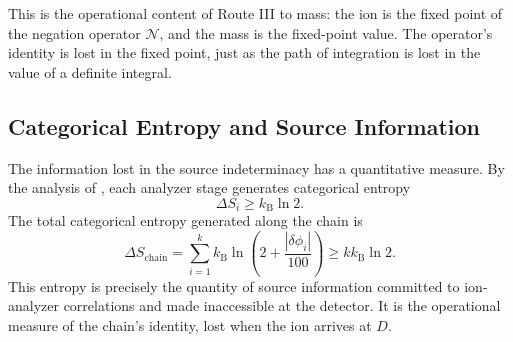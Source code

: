 \documentclass[twocolumn,10pt,a4paper]{article}
\theoremstyle{definition}
\theoremstyle{remark}
\newcommand{\kB}{k_{\mathrm{B}}}
\newcommand{\Negation}{\mathcal{N}}
\begin{document}
This is the operational content of Route III to mass: the ion is the fixed point of the negation operator $\Negation$, and the mass is the fixed-point value. The operator's identity is lost in the fixed point, just as the path of integration is lost in the value of a definite integral.

\subsection{Categorical Entropy and Source Information}

The information lost in the source indeterminacy has a quantitative measure. By the analysis of \citep{sachikonye2025counting}, each analyzer stage generates categorical entropy
\begin{equation}
    \Delta S_i \geq \kB \ln 2.
\end{equation}
The total categorical entropy generated along the chain is
\begin{equation}
    \Delta S_{\mathrm{chain}} = \sum_{i=1}^{k} \kB \ln\!\left(2 + \frac{|\delta\phi_i|}{100}\right) \geq k \kB \ln 2.
    \label{eq:chain-entropy}
\end{equation}
This entropy is precisely the quantity of source information committed to ion-analyzer correlations and made inaccessible at the detector. It is the operational measure of the chain's identity, lost when the ion arrives at $D$.
\end{document}
